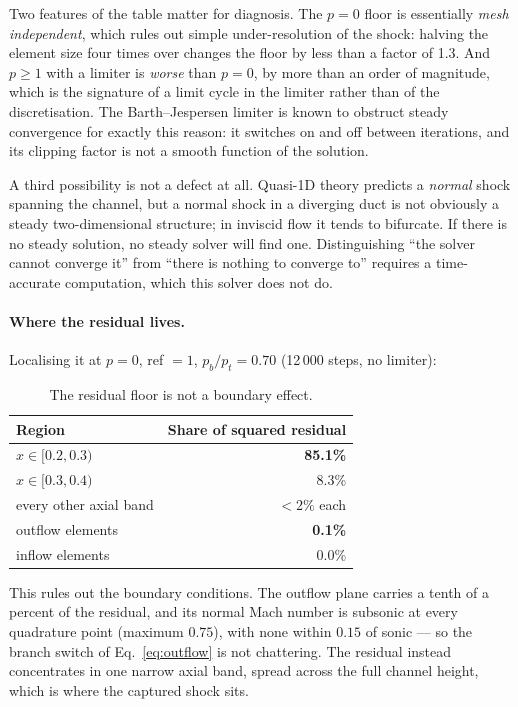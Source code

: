 \documentclass[11pt,a4paper]{article}
\begin{document}
Two features of the table matter for diagnosis.  The $p = 0$ floor is
essentially \emph{mesh independent}, which rules out simple under-resolution of
the shock: halving the element size four times over changes the floor by less
than a factor of 1.3.  And $p \ge 1$ with a limiter is \emph{worse} than $p = 0$,
by more than an order of magnitude, which is the signature of a limit cycle in
the limiter rather than of the discretisation.  The Barth--Jespersen limiter is
known to obstruct steady convergence for exactly this reason: it switches on and
off between iterations, and its clipping factor is not a smooth function of the
solution.

A third possibility is not a defect at all.  Quasi-1D theory predicts a
\emph{normal} shock spanning the channel, but a normal shock in a diverging duct
is not obviously a steady two-dimensional structure; in inviscid flow it tends
to bifurcate.  If there is no steady solution, no steady solver will find one.
Distinguishing ``the solver cannot converge it'' from ``there is nothing to
converge to'' requires a time-accurate computation, which this solver does not
do.

\paragraph{Where the residual lives.}
Localising it at $p=0$, ref $=1$, $p_b/p_t = 0.70$ (12\,000 steps, no limiter):

\begin{table}[H]
  \centering
  \small
  \begin{tabular}{lr}
    \toprule
    Region & Share of squared residual \\
    \midrule
    $x \in [0.2, 0.3)$ & \textbf{85.1\%} \\
    $x \in [0.3, 0.4)$ & 8.3\% \\
    every other axial band & $< 2\%$ each \\
    \midrule
    outflow elements & \textbf{0.1\%} \\
    inflow elements  & 0.0\% \\
    \bottomrule
  \end{tabular}
  \caption{The residual floor is not a boundary effect.}
  \label{tab:shockloc}
\end{table}

This rules out the boundary conditions.  The outflow plane carries a tenth of a
percent of the residual, and its normal Mach number is subsonic at every
quadrature point (maximum $0.75$), with none within $0.15$ of sonic --- so the
branch switch of Eq.~\eqref{eq:outflow} is not chattering.  The residual instead
concentrates in one narrow axial band, spread across the full channel height,
which is where the captured shock sits.
\end{document}
